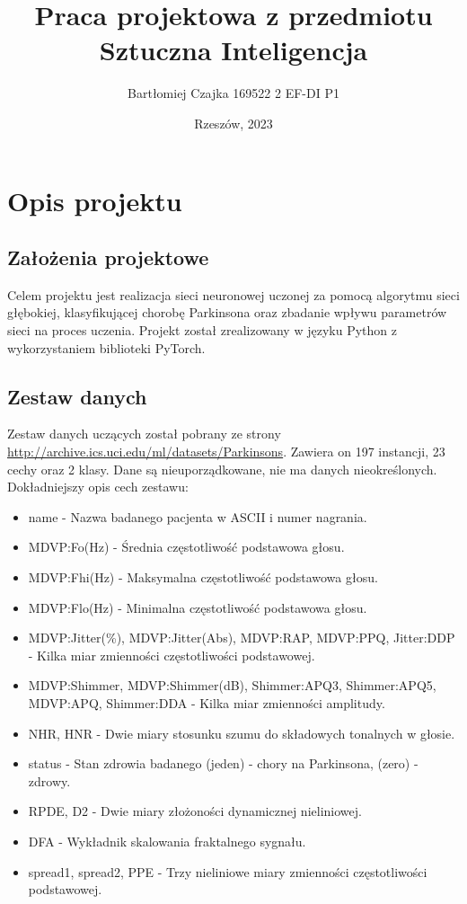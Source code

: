 \documentclass{article}
\title{\textbf{Praca projektowa z przedmiotu Sztuczna Inteligencja}}
\author{Bartłomiej Czajka 169522 2 EF-DI P1}
\date{Rzeszów, 2023}
\begin{document}
\maketitle
\pagebreak



\tableofcontents{}
\section{Opis projektu}
\subsection{Założenia projektowe}
Celem projektu jest realizacja sieci neuronowej uczonej za pomocą algorytmu sieci głębokiej, klasyfikującej chorobę Parkinsona oraz zbadanie wpływu parametrów sieci na proces uczenia.
Projekt został zrealizowany w języku Python z wykorzystaniem biblioteki PyTorch.
\subsection{Zestaw danych}
Zestaw danych uczących został pobrany ze strony \href{http://archive.ics.uci.edu/ml/datasets/Parkinsons}{http://archive.ics.uci.edu/ml/datasets/Parkinsons}.
Zawiera on 197 instancji, 23 cechy oraz 2 klasy. Dane są nieuporządkowane, nie ma danych nieokreślonych.
Dokładniejszy opis cech zestawu:
\begin{itemize}
    \item name - Nazwa badanego pacjenta w ASCII i numer nagrania.
    \item MDVP:Fo(Hz) - Średnia częstotliwość podstawowa głosu.
    \item MDVP:Fhi(Hz) - Maksymalna częstotliwość podstawowa głosu.
    \item MDVP:Flo(Hz) - Minimalna częstotliwość podstawowa głosu.
    \item MDVP:Jitter(\%), MDVP:Jitter(Abs), MDVP:RAP, MDVP:PPQ, Jitter:DDP - Kilka miar zmienności częstotliwości podstawowej.
    \item MDVP:Shimmer, MDVP:Shimmer(dB), Shimmer:APQ3, Shimmer:APQ5, MDVP:APQ, Shimmer:DDA - Kilka miar zmienności amplitudy.
    \item NHR, HNR - Dwie miary stosunku szumu do składowych tonalnych w głosie.
    \item status - Stan zdrowia badanego (jeden) - chory na Parkinsona, (zero) - zdrowy.
    \item RPDE, D2 - Dwie miary złożoności dynamicznej nieliniowej.
    \item DFA - Wykładnik skalowania fraktalnego sygnału.
    \item spread1, spread2, PPE - Trzy nieliniowe miary zmienności częstotliwości podstawowej.
\end{itemize}
\end{document}
